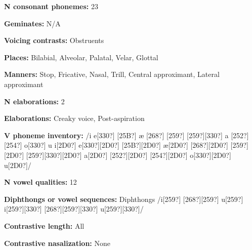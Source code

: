 \begin{styleBody}
\textbf{N consonant phonemes:} 23
\end{styleBody}

\begin{styleBody}
\textbf{Geminates:} N/A
\end{styleBody}

\begin{styleBody}
\textbf{Voicing contrasts:} Obstruents
\end{styleBody}

\begin{styleBody}
\textbf{Places:} Bilabial, Alveolar, Palatal, Velar, Glottal
\end{styleBody}

\begin{styleBody}
\textbf{Manners:} Stop, Fricative, Nasal, Trill, Central approximant, Lateral approximant
\end{styleBody}

\begin{styleBody}
\textbf{N elaborations:} 2
\end{styleBody}

\begin{styleBody}
\textbf{Elaborations:} Creaky voice, Post-aspiration
\end{styleBody}

\begin{styleBody}
\textbf{V phoneme inventory:} /i e[330?] [25B?] æ [268?] [259?] [259?][330?] a [252?] [254?] o[330?] u i[2D0?] e[330?][2D0?] [25B?][2D0?] æ[2D0?] [268?][2D0?] [259?][2D0?] [259?][330?][2D0?] a[2D0?] [252?][2D0?] [254?][2D0?] o[330?][2D0?] u[2D0?]/
\end{styleBody}

\begin{styleBody}
\textbf{N vowel qualities:} 12
\end{styleBody}

\begin{styleBody}
\textbf{Diphthongs or vowel sequences:} Diphthongs /i[259?] [268?][259?] u[259?] i[259?][330?] [268?][259?][330?] u[259?][330?]/
\end{styleBody}

\begin{styleBody}
\textbf{Contrastive length:} All
\end{styleBody}

\begin{styleBody}
\textbf{Contrastive nasalization:} None
\end{styleBody}

